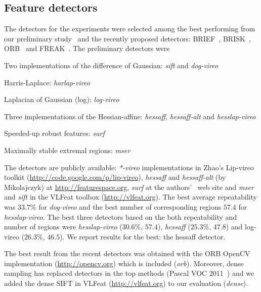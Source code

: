 \documentclass[review]{elsarticle}
\begin{document}
\subsection{Feature detectors}
%
The detectors for the experiments were selected among the
best performing from our preliminary
study~\cite{LanKanKam:2012} and the recently proposed
detectors: BRIEF~\cite{brief}, BRISK~\cite{brisk}, ORB~\cite{orb} and
FREAK~\cite{freak}. The preliminary detectors were
\begin{compactenum}
\item Two implementations of the difference of Gaussian: \textit{sift} and \textit{dog-vireo}
\item Harris-Laplace: \textit{harlap-vireo}
\item Laplacian of Gaussian (log): \textit{log-vireo}
\item Three implementations of the Hessian-affine: \textit{hessaff}, \textit{hessaff-alt} and \textit{hesslap-vireo} 
\item Speeded-up robust features: \textit{surf}
\item Maximally stable extremal regions: \textit{mser}
\end{compactenum}
The detectors are publicly available:
 \textit{*-vireo} implementations in Zhao's
Lip-vireo toolkit (\url{http://code.google.com/p/lip-vireo}),
\textit{hessaff} and \textit{hessaff-alt} (by Mikolajczyk) at
\url{http://featurespace.org}, \textit{surf} at the
authors'~\cite{BayEssTuy:2008} web site and \textit{mser} and \textit{sift} in
the VLFeat toolbox (\url{http://vlfeat.org}). 
The best average repeatability was $33.7\%$ for \textit{dog-vireo} and the
best number of corresponding regions $57.4$ for \textit{hesslap-vireo}. The
best three detectors based on the both repeatability and number of regions were
\textit{hesslap-vireo} ($30.6\%$, $57.4$), \textit{hessaff} ($25.3\%$, $47.8$) and
log-vireo ($26.3\%$, $46.5$). We report results for the best:
the hessaff detector.

The best result from the recent detectors was obtained with the ORB
OpenCV implementation (\url{http://opencv.org}) which is included
(\textit{orb}). Moreover,
dense sampling has replaced detectors in the top methods
(Pascal VOC 2011~\cite{VOC:2011}) and
we added the dense SIFT in VLFeat (\url{http://vlfeat.org})
to our evaluation (\textit{dense}).
\end{document}
